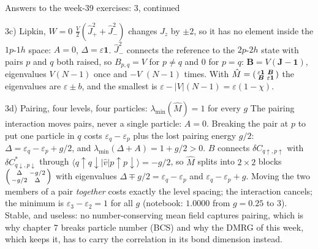 \documentclass[aspectratio=169,10pt]{beamer}
\newcommand{\element}[3]{\langle #1\vert #2\vert #3\rangle}
\begin{document}
\begin{frame}{Answers to the week-39 exercises: 3, continued}
  \footnotesize
  \begin{block}{3c) Lipkin, $W=0$}
    $\frac V2(\hat J_+^2+\hat J_-^2)$ changes $J_z$ by $\pm2$, so it has no element inside the $1p$-$1h$ space: $A=0$, $\Delta=\varepsilon\bm1$. $\hat J_-^2$ connects the reference to the $2p$-$2h$ state with pairs $p$ and $q$ both raised, so $B_{p,q}=V$ for $p\ne q$ and $0$ for $p=q$: $\bm B=V(\bm J-\bm 1)$, eigenvalues $V(N-1)$ once and $-V$ $(N-1)$ times. With $\hat M=\begin{psmallmatrix}\varepsilon\bm1&\bm B\\\bm B&\varepsilon\bm1\end{psmallmatrix}$ the eigenvalues are $\varepsilon\pm b$, and the smallest is $\varepsilon-|V|(N-1)=\varepsilon(1-\chi)$.
  \end{block}
  \begin{block}{3d) Pairing, four levels, four particles: $\lambda_{\min}(\hat M)=1$ for every $g$}
    The pairing interaction moves pairs, never a single particle: $A=0$. Breaking the pair at $p$ to put one particle in $q$ costs $\varepsilon_q-\varepsilon_p$ plus the lost pairing energy $g/2$: $\Delta=\varepsilon_q-\varepsilon_p+g/2$, and $\lambda_{\min}(\Delta+A)=1+g/2>0$. $B$ connects $\delta C_{q\uparrow,p\uparrow}$ with $\delta C^{*}_{q\downarrow,p\downarrow}$ through $\element{q\!\uparrow q\!\downarrow}{\hat v}{p\!\uparrow p\!\downarrow}=-g/2$, so $\hat M$ splits into $2\times2$ blocks $\begin{psmallmatrix}\Delta&-g/2\\-g/2&\Delta\end{psmallmatrix}$ with eigenvalues $\Delta\mp g/2=\varepsilon_q-\varepsilon_p$ and $\varepsilon_q-\varepsilon_p+g$. Moving the two members of a pair \emph{together} costs exactly the level spacing; the interaction cancels; the minimum is $\varepsilon_3-\varepsilon_2=1$ for all $g$ (notebook: $1.0000$ from $g=0.25$ to $3$). Stable, and useless: no number-conserving mean field captures pairing, which is why chapter 7 breaks particle number (BCS) and why the DMRG of this week, which keeps it, has to carry the correlation in its bond dimension instead.
  \end{block}
\end{frame}
\end{document}
